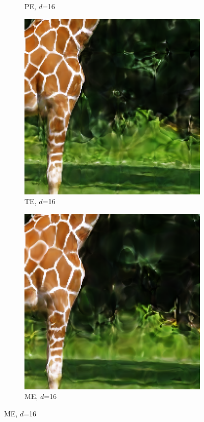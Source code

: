 \begin{figure}[!h]
\begin{subfigure}{.25\textwidth}
      \caption{PE, $d$=16}
      \label{PE16}
    \end{subfigure}\hfil
    \begin{subfigure}{.25\textwidth}
      \includegraphics[width=\textwidth]{Bilder/Giraffe/Bildausschnitte/image_result_tent12000_indim16_lr0.006667_m4.eps}
      \caption{TE, $d$=16}
      \label{TE16}
    \end{subfigure}\hfil
    \begin{subfigure}{.25\textwidth}
      \includegraphics[width=\textwidth]{Bilder/Giraffe/Bildausschnitte/image_result_magnitude12000_indim16_lr0.006667_sigma0.1.eps}
      \caption{ME, $d$=16}
      \label{ME16}
    \end{subfigure}\hfil


\end{figure}
